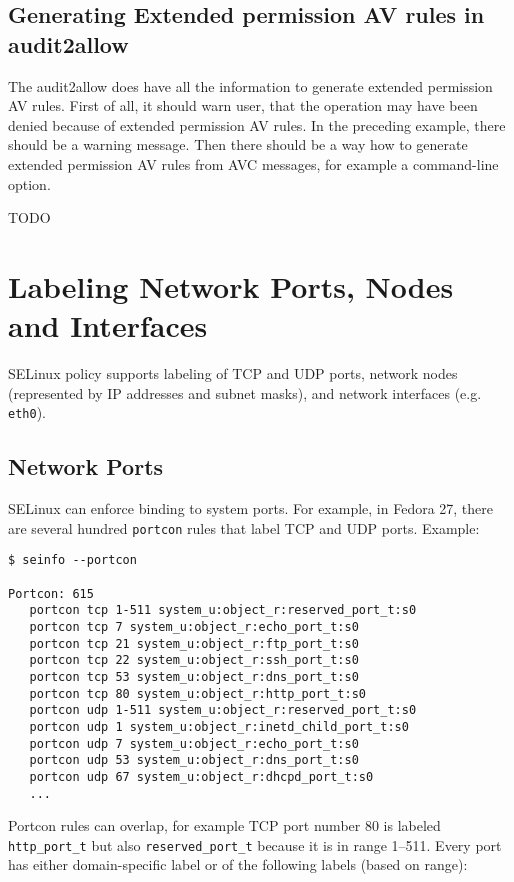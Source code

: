 \subsection{Generating Extended permission AV rules in audit2allow}
The audit2allow does have all the information to generate extended permission AV
rules. First of all, it should warn user, that the operation may have been
denied because of extended permission AV rules. In the preceding example, there
should be a warning message. Then there should be a way how to generate extended
permission AV rules from AVC messages, for example a command-line option.

TODO

\section{Labeling Network Ports, Nodes and Interfaces}
SELinux policy supports labeling of TCP and UDP ports, network nodes
(represented by IP addresses and subnet masks), and network interfaces (e.g.
\texttt{eth0}).

\subsection{Network Ports}
SELinux can enforce binding to system ports. For example, in Fedora 27, there
are several hundred \texttt{portcon} rules that label TCP and UDP ports.
Example:
\begin{lstlisting}
$ seinfo --portcon

Portcon: 615
   portcon tcp 1-511 system_u:object_r:reserved_port_t:s0
   portcon tcp 7 system_u:object_r:echo_port_t:s0
   portcon tcp 21 system_u:object_r:ftp_port_t:s0
   portcon tcp 22 system_u:object_r:ssh_port_t:s0
   portcon tcp 53 system_u:object_r:dns_port_t:s0
   portcon tcp 80 system_u:object_r:http_port_t:s0
   portcon udp 1-511 system_u:object_r:reserved_port_t:s0
   portcon udp 1 system_u:object_r:inetd_child_port_t:s0
   portcon udp 7 system_u:object_r:echo_port_t:s0
   portcon udp 53 system_u:object_r:dns_port_t:s0
   portcon udp 67 system_u:object_r:dhcpd_port_t:s0
   ...
\end{lstlisting}
Portcon rules can overlap, for example TCP port number 80 is labeled
\texttt{http\_port\_t} but also \texttt{reserved\_port\_t} because it is in range
1--511. Every port has either domain-specific label or of the following labels
(based on range):

